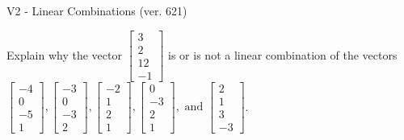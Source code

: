 \begin{exercise}
  \begin{exerciseTitle}V2 - Linear Combinations (ver. 621)\end{exerciseTitle}
  \begin{exerciseStatement}
    Explain why the vector \(\left[\begin{array}{c}
3 \\
2 \\
12 \\
-1
\end{array}\right]\)  is or is not a linear 
	combination of the vectors \(\left[\begin{array}{c}
-4 \\
0 \\
-5 \\
1
\end{array}\right] , \left[\begin{array}{c}
-3 \\
0 \\
-3 \\
2
\end{array}\right] , \left[\begin{array}{c}
-2 \\
1 \\
2 \\
1
\end{array}\right] , \left[\begin{array}{c}
0 \\
-3 \\
2 \\
1
\end{array}\right] , \text{ and } \left[\begin{array}{c}
2 \\
1 \\
3 \\
-3
\end{array}\right]\).
	



\end{exerciseStatement}
\end{exercise}
